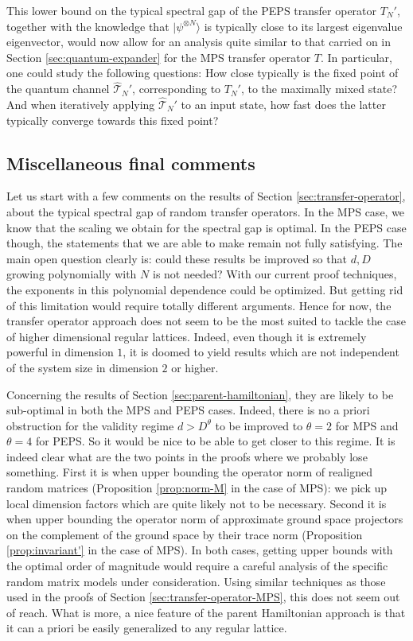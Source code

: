\documentclass{amsart}
\newcommand{\ket}[1]{| #1 \rangle}
\begin{document}
This lower bound on the typical spectral gap of the PEPS transfer operator $T_N'$, together with the knowledge that $\ket{\psi^{\otimes N}}$ is typically close to its largest eigenvalue eigenvector, would now allow for an analysis quite similar to that carried on in Section \ref{sec:quantum-expander} for the MPS transfer operator $T$. In particular, one could study the following questions: How close typically is the fixed point of the quantum channel $\hat{\mathcal{T}}_N'$, corresponding to $T_N'$, to the maximally mixed state? And when iteratively applying $\hat{\mathcal{T}}_N'$ to an input state, how fast does the latter typically converge towards this fixed point?

\subsection{Miscellaneous final comments} \hfill\par\smallskip

Let us start with a few comments on the results of Section \ref{sec:transfer-operator}, about the typical spectral gap of random transfer operators. In the MPS case, we know that the scaling we obtain for the spectral gap is optimal. In the PEPS case though, the statements that we are able to make remain not fully satisfying. The main open question clearly is: could these results be improved so that $d,D$ growing polynomially with $N$ is not needed? With our current proof techniques, the exponents in this polynomial dependence could be optimized. But getting rid of this limitation would require totally different arguments.
Hence for now, the transfer operator approach does not seem to be the most suited to tackle the case of higher dimensional regular lattices. Indeed, even though it is extremely powerful in dimension $1$, it is doomed to yield results which are not independent of the system size in dimension $2$ or higher.

Concerning the results of Section \ref{sec:parent-hamiltonian}, they are likely to be sub-optimal in both the MPS and PEPS cases. Indeed, there is no a priori obstruction for the validity regime $d> D^{\theta}$ to be improved to $\theta=2$ for MPS and $\theta=4$ for PEPS. So it would be nice to be able to get closer to this regime. It is indeed clear what are the two points in the proofs where we probably lose something. First it is when upper bounding the operator norm of realigned random matrices (Proposition \ref{prop:norm-M} in the case of MPS): we pick up local dimension factors which are quite likely not to be necessary. Second it is when upper bounding the operator norm of approximate ground space projectors on the complement of the ground space by their trace norm (Proposition \ref{prop:invariant'} in the case of MPS). In both cases, getting upper bounds with the optimal order of magnitude would require a careful analysis of the specific random matrix models under consideration. Using similar techniques as those used in the proofs of Section \ref{sec:transfer-operator-MPS}, this does not seem out of reach.
What is more, a nice feature of the parent Hamiltonian approach is that it can a priori be easily generalized to any regular lattice.
\end{document}
